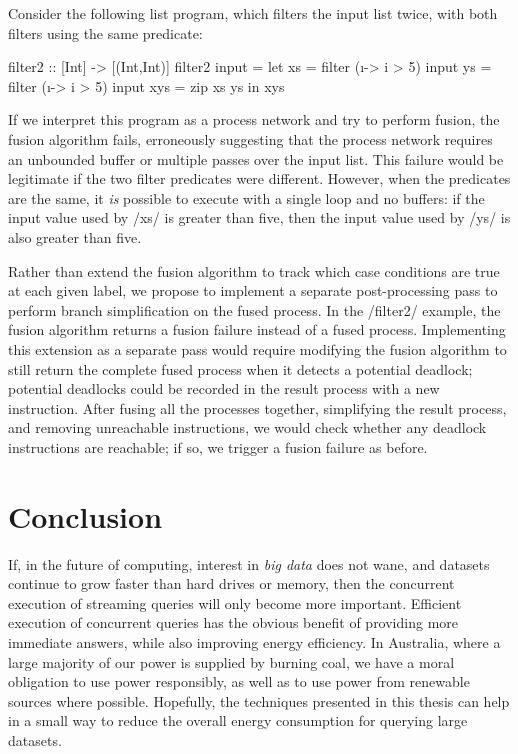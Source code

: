 Consider the following list program, which filters the input list twice, with both filters using the same predicate:

\begin{haskell}
filter2 :: [Int] -> [(Int,Int)]
filter2 input =
 let xs  = filter (\i -> i > 5) input
     ys  = filter (\i -> i > 5) input
     xys = zip xs ys
 in  xys
\end{haskell}

If we interpret this program as a process network and try to perform fusion, the fusion algorithm fails, erroneously suggesting that the process network requires an unbounded buffer or multiple passes over the input list.
This failure would be legitimate if the two filter predicates were different.
However, when the predicates are the same, it \emph{is} possible to execute with a single loop and no buffers: if the input value used by \Hs/xs/ is greater than five, then the input value used by \Hs/ys/ is also greater than five.

Rather than extend the fusion algorithm to track which case conditions are true at each given label, we propose to implement a separate post-processing pass to perform branch simplification on the fused process.
In the \Hs/filter2/ example, the fusion algorithm returns a fusion failure instead of a fused process.
Implementing this extension as a separate pass would require modifying the fusion algorithm to still return the complete fused process when it detects a potential deadlock; potential deadlocks could be recorded in the result process with a new instruction.
After fusing all the processes together, simplifying the result process, and removing unreachable instructions, we would check whether any deadlock instructions are reachable; if so, we trigger a fusion failure as before.

\section{Conclusion}

If, in the future of computing, interest in \emph{big data} does not wane, and datasets continue to grow faster than hard drives or memory, then the concurrent execution of streaming queries will only become more important.
Efficient execution of concurrent queries has the obvious benefit of providing more immediate answers, while also improving energy efficiency.
In Australia, where a large majority of our power is supplied by burning coal, we have a moral obligation to use power responsibly, as well as to use power from renewable sources where possible.
Hopefully, the techniques presented in this thesis can help in a small way to reduce the overall energy consumption for querying large datasets.



